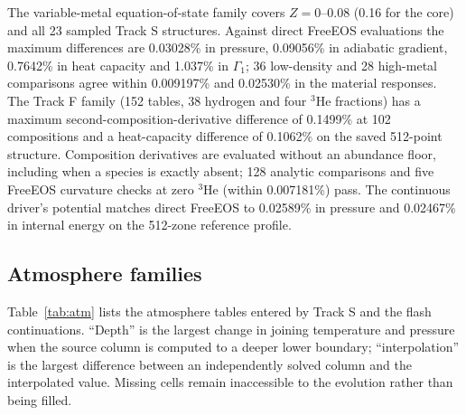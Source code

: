 The variable-metal equation-of-state family covers $Z=0$--0.08 (0.16 for
the core) and all 23 sampled Track S structures. Against direct FreeEOS
evaluations the maximum differences are 0.03028\% in pressure, 0.09056\% in
adiabatic gradient, 0.7642\% in heat capacity and 1.037\% in $\Gamma_1$;
36 low-density and 28 high-metal comparisons agree within 0.009197\% and
0.02530\% in the material responses. The Track F family (152 tables, 38
hydrogen and four $^3$He fractions) has a maximum second-composition-derivative
difference of 0.1499\% at 102 compositions and a heat-capacity difference of
0.1062\% on the saved 512-point structure. Composition derivatives are
evaluated without an abundance floor, including when a species is exactly
absent; 128 analytic comparisons and five FreeEOS curvature checks at zero
$^3$He (within 0.007181\%) pass. The continuous driver's potential matches
direct FreeEOS to 0.02589\% in pressure and 0.02467\% in internal energy on
the 512-zone reference profile.

\subsection*{Atmosphere families}
Table~\ref{tab:atm} lists the atmosphere tables entered by Track S and the
flash continuations. ``Depth'' is the largest change in joining temperature
and pressure when the source column is computed to a deeper lower boundary;
``interpolation'' is the largest difference between an independently solved
column and the interpolated value. Missing cells remain inaccessible to the
evolution rather than being filled.

